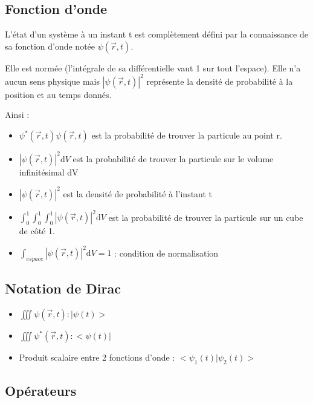 \documentclass[french]{yLectureNote}
\renewcommand{\vec}{\overrightarrow}
\newcommand{\dd}{\mathrm{d}}
\newcommand{\fo}{\psi(\vec{r},t)}
\newcommand{\foe}{\psi^*(\vec{r},t)}
\begin{document}
\subsection{Fonction d'onde}
\begin{theorem}[Postulat 1]
L'état d'un système à un instant t est complètement défini par la connaissance de sa fonction d'onde notée \(\fo\).
\end{theorem}
\begin{proposition}
Elle est normée (l'intégrale de sa différentielle vaut 1 sur tout l'espace). Elle n'a aucun sens physique mais \(|\fo|^2\) représente la densité de probabilité à la position et au temps donnés.
\end{proposition}
Ainsi :
\begin{itemize}
 \item \(\foe\fo\) est la probabilité de trouver la particule au point r.
 \item \(|\fo|^2\dd V\) est la probabilité de trouver la particule sur le volume infinitésimal dV
  \item \(|\fo|^2\) est la densité de probabilité à l'instant t
 \item \(\int_{0}^1\int_{0}^1\int_{0}^1 |\fo|^2\dd V\) est la probabilité de trouver la particule sur un cube de c\^oté 1.
 \item \(\int_{espace} |\fo|^2 \dd V = 1\) : condition de normalisation
\end{itemize}
\subsection{Notation de Dirac}
\begin{itemize}
 \item \(\iiint \fo : |\psi(t)>\)
  \item \(\iiint \foe : <\psi(t)|\)
  \item Produit scalaire entre 2 fonctions d'onde : \(<\psi_1(t)|\psi_2(t)>\)
\end{itemize}

\subsection{Opérateurs}
\end{document}
